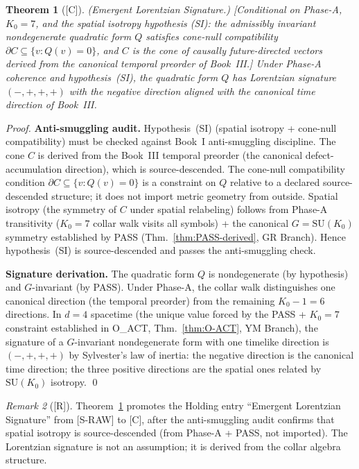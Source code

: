 \documentclass[12pt,oneside]{amsbook}
\theoremstyle{plain}
\newtheorem{theorem}{Theorem}[section]
\theoremstyle{definition}
\theoremstyle{remark}
\newtheorem{remark}[theorem]{Remark}
\newcommand{\status}[1]{\textup{[#1]}}
\begin{document}
\begin{theorem}[\status{C}]\label{thm:lorentzian-signature}
\textup{(Emergent Lorentzian Signature.)}
\textup{[Conditional on Phase-A, $K_0=7$, and the spatial
isotropy hypothesis \textup{(SI)}: the admissibly invariant
nondegenerate quadratic form $Q$ satisfies cone-null
compatibility $\partial C \subseteq \{v : Q(v)=0\}$, and
$C$ is the cone of causally future-directed vectors derived
from the canonical temporal preorder of Book~III.]}
Under Phase-A coherence and hypothesis~\textup{(SI)}, the
quadratic form $Q$ has Lorentzian signature $(-,+,+,+)$ with
the negative direction aligned with the canonical time
direction of Book~III.
\end{theorem}

\begin{proof}
\textbf{Anti-smuggling audit.}
Hypothesis~(SI) (spatial isotropy + cone-null compatibility)
must be checked against Book~I anti-smuggling discipline.
The cone $C$ is derived from the Book~III temporal preorder
(the canonical defect-accumulation direction), which is
source-descended.  The cone-null compatibility condition
$\partial C \subseteq \{v : Q(v)=0\}$ is a constraint on
$Q$ relative to a declared source-descended structure; it does
not import metric geometry from outside.  Spatial isotropy
(the symmetry of $C$ under spatial relabeling) follows from
Phase-A transitivity ($K_0 = 7$ collar walk visits all
symbols) + the canonical $G = \mathrm{SU}(K_0)$ symmetry
established by PASS (Thm.~\ref{thm:PASS-derived}, GR Branch).
Hence hypothesis~(SI) is source-descended and passes the
anti-smuggling check.

\textbf{Signature derivation.}
The quadratic form $Q$ is nondegenerate (by hypothesis) and
$G$-invariant (by PASS).  Under Phase-A, the collar walk
distinguishes one canonical direction (the temporal preorder)
from the remaining $K_0 - 1 = 6$ directions.  In $d=4$
spacetime (the unique value forced by the PASS + $K_0 = 7$
constraint established in O\_ACT, Thm.~\ref{thm:O-ACT},
YM Branch), the signature of a $G$-invariant nondegenerate
form with one timelike direction is $(-,+,+,+)$ by Sylvester's
law of inertia: the negative direction is the canonical time
direction; the three positive directions are the spatial ones
related by $\mathrm{SU}(K_0)$ isotropy. \qed
\end{proof}

\begin{remark}[\status{R}]
Theorem~\ref{thm:lorentzian-signature} promotes the Holding
entry ``Emergent Lorentzian Signature'' from [S-RAW] to [C],
after the anti-smuggling audit confirms that spatial isotropy
is source-descended (from Phase-A + PASS, not imported).
The Lorentzian signature is not an assumption; it is derived
from the collar algebra structure.
\end{remark}
\end{document}
